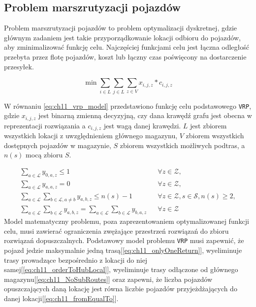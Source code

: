 \subsection{Problem marszrutyzacji pojazdów}

Problem marszrutyzacji pojazdów to problem optymalizacji dyskretnej, gdzie głównym zadaniem jest takie przyporządkowanie lokacji odbioru do pojazdów, aby zminimalizować funkcję celu. Najczęściej funkcjami celu jest łączna odległość przebyta przez flotę pojazdów, koszt lub łączny czas poświęcony na dostarczenie przesyłek. 

\begin{equation}
    \label{eq:ch11_vrp_model}
  \min \sum_{i \in L} \sum_{j \in L} \sum_{z \in V}  x_{i,j,z} * c_{i,j,z}
\end{equation}

W równaniu \ref{eq:ch11_vrp_model} przedstawiono funkcję celu podstawowego \texttt{VRP}, gdzie $x_{i,j,z}$ jest binarną zmienną decyzyjną, czy dana krawędź grafu jest obecna w reprezentacji rozwiązania a $c_{i,j,z}$ jest wagą danej krawędzi. $L$ jest zbiorem wszystkich lokacji z uwzględnieniem głównego magazynu, $V$ zbiorem wszystkich dostępnych pojazdów w magazynie, $S$ zbiorem wszystkich możliwych podtras, a $n(s)$ mocą zbioru $S$.

\begin{align}
    \sum_{a \in \mathcal{L}} y_{0,a,z} \leq 1 && \forall z \in \mathcal{Z},
        \label{eq:ch11_onlyOneReturn}
    \\
    \sum_{a \in \mathcal{L}} y_{a,a,z} = 0 && \forall z \in \mathcal{Z},
        \label{eq:ch11_orderToHubLocal}
    \\
    \sum_{a \in \mathcal{L}} \sum_{b \in \mathcal{L}, a \neq b} y_{a,b,z} \leq n(s) - 1 &&\forall z \in \mathcal{Z}, s \in \mathcal{S}, n(s) \geq 2,
        \label{eq:ch11_NoSubRoutes}
    \\ 
\sum_{a \in \mathcal{L}}\sum_{b \in \mathcal{L}} y_{a,b,z}  =  \sum_{a \in \mathcal{L}} \sum_{b \in \mathcal{L}} y_{b,a,z} && \forall z \in \mathcal{Z}
        \label{eq:ch11_fromEqualTo}
\end{align}
Model matematyczny problemu, poza zaprezentowaniem optymalizowanej funkcji celu, musi zawierać ograniczenia zwężające przestrzeń rozwiązań do zbioru rozwiązań dopuszczalnych. Podstawowy model problemu \texttt{VRP} musi zapewnić, że pojazd jedzie maksymalnie jedną trasą[\ref{eq:ch11_onlyOneReturn}], wyeliminuje trasy prowadzące bezpośrednio z lokacji do niej samej[\ref{eq:ch11_orderToHubLocal}], wyeliminuje trasy odłączone od głównego magazynu[\ref{eq:ch11_NoSubRoutes}] oraz zapewni, że liczba pojazdów opuszczających daną lokację jest równa liczbie pojazdów przyjeżdżających do danej lokacji[\ref{eq:ch11_fromEqualTo}].

